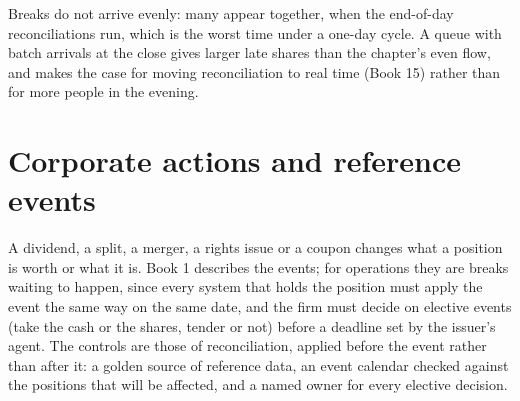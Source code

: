 \begin{remark}\label{rem:fm:operations:batch}
Breaks do not arrive evenly: many appear together, when the end-of-day reconciliations run, which is the worst time under a one-day cycle. A queue
with batch arrivals at the close gives larger late shares than the chapter's even flow, and makes the case for moving reconciliation to real time
(Book 15) rather than for more people in the evening.
\end{remark}

\begin{omfigure}

\label{fig:fm:operations:ageing}
\end{omfigure}

\section{Corporate actions and reference events}

A dividend, a split, a merger, a rights issue or a coupon changes what a position is worth or what it is. Book 1 describes the events; for
operations they are breaks waiting to happen, since every system that holds the position must apply the event the same way on the same date, and
the firm must decide on elective events (take the cash or the shares, tender or not) before a deadline set by the issuer's agent. The controls are
those of reconciliation, applied before the event rather than after it: a golden source of reference data, an event calendar checked against the
positions that will be affected, and a named owner for every elective decision.

